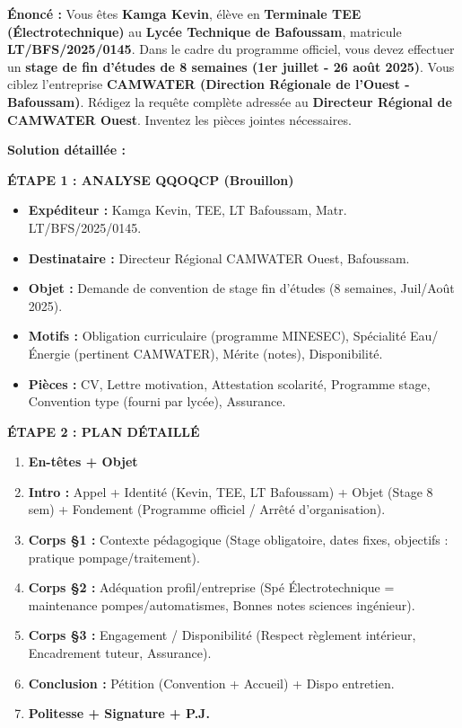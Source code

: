 \documentclass[11pt]{article}
\begin{document}
\begin{exoresolu}
\textbf{Énoncé :} Vous êtes \textbf{Kamga Kevin}, élève en \textbf{Terminale TEE (Électrotechnique)} au \textbf{Lycée Technique de Bafoussam}, matricule \textbf{LT/BFS/2025/0145}. Dans le cadre du programme officiel, vous devez effectuer un \textbf{stage de fin d'études de 8 semaines (1er juillet - 26 août 2025)}. Vous ciblez l'entreprise \textbf{CAMWATER (Direction Régionale de l'Ouest - Bafoussam)}. Rédigez la requête complète adressée au \textbf{Directeur Régional de CAMWATER Ouest}. Inventez les pièces jointes nécessaires.

\tcblower
\textbf{Solution détaillée :}

\textbf{ÉTAPE 1 : ANALYSE QQOQCP (Brouillon)}
\begin{itemize}
    \item \textbf{Expéditeur :} Kamga Kevin, TEE, LT Bafoussam, Matr. LT/BFS/2025/0145.
    \item \textbf{Destinataire :} Directeur Régional CAMWATER Ouest, Bafoussam.
    \item \textbf{Objet :} Demande de convention de stage fin d'études (8 semaines, Juil/Août 2025).
    \item \textbf{Motifs :} Obligation curriculaire (programme MINESEC), Spécialité Eau/Énergie (pertinent CAMWATER), Mérite (notes), Disponibilité.
    \item \textbf{Pièces :} CV, Lettre motivation, Attestation scolarité, Programme stage, Convention type (fourni par lycée), Assurance.
\end{itemize}

\textbf{ÉTAPE 2 : PLAN DÉTAILLÉ}
\begin{enumerate}
    \item \textbf{En-têtes + Objet}
    \item \textbf{Intro :} Appel + Identité (Kevin, TEE, LT Bafoussam) + Objet (Stage 8 sem) + Fondement (Programme officiel / Arrêté d'organisation).
    \item \textbf{Corps §1 :} Contexte pédagogique (Stage obligatoire, dates fixes, objectifs : pratique pompage/traitement).
    \item \textbf{Corps §2 :} Adéquation profil/entreprise (Spé Électrotechnique = maintenance pompes/automatismes, Bonnes notes sciences ingénieur).
    \item \textbf{Corps §3 :} Engagement / Disponibilité (Respect règlement intérieur, Encadrement tuteur, Assurance).
    \item \textbf{Conclusion :} Pétition (Convention + Accueil) + Dispo entretien.
    \item \textbf{Politesse + Signature + P.J.}
\end{enumerate}


\end{exoresolu}
\end{document}
